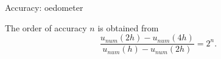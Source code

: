 \documentclass[mathserif,professionalfont,hyperref={pdfpagelabels=false}]{beamer}
\begin{document}
\begin{frame}{Accuracy: oedometer}
  \begin{minipage}{\linewidth}
      \centering
      \begin{minipage}{0.42\linewidth}
	\begin{tcolorbox}[colback=red!5,colframe=red!50!black,title=Richardson's extrapolation]
	\small{The order of accuracy $n$ is obtained from $$\frac{u_{num}(2h)-u_{num}(4h)}{u_{num}(h)-u_{num}(2h)} = 2^{n}.$$}
	\end{tcolorbox}
      \end{minipage}
    \hspace{0.01\linewidth}
      \begin{minipage}{0.48\linewidth}
      \: \:
      \:
      \:
      \:
      \: 
            \: \:
      \:
      \:
      \:
      \:
                  \: \:


       \begin{overlayarea}{\textwidth}{6cm}
\end{overlayarea}
      \end{minipage}
  \end{minipage}
\end{frame}
\end{document}
